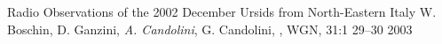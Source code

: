 
\begin{cvhonors}

  \cvhonor
{Radio Observations of the 2002 December Ursids from North-Eastern
   Italy}
{ W. Boschin, D. Ganzini, \emph{A. Candolini}, G. Candolini, 
, WGN, 31:1 29--30}
{}
{2003}
\end{cvhonors}











